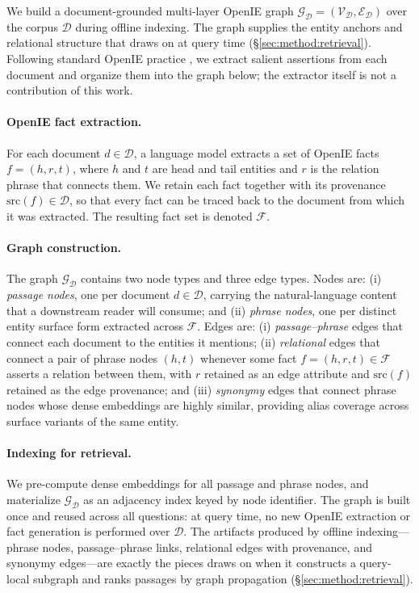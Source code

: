 We build a document-grounded multi-layer OpenIE graph
$\mathcal{G}_{\mathcal{D}}=(\mathcal{V}_{\mathcal{D}},\mathcal{E}_{\mathcal{D}})$
over the corpus $\mathcal{D}$ during offline indexing. The graph supplies
the entity anchors and relational structure that \methodname{} draws on at
query time (\S\ref{sec:method:retrieval}). Following standard OpenIE
practice \citep{angeli2015leveraging,gutierrez2025hipporag}, we extract
salient assertions from each document and organize them into the graph
below; the extractor itself is not a contribution of this work.

\paragraph{OpenIE fact extraction.}
For each document $d \in \mathcal{D}$, a language model extracts a set of
OpenIE facts $f = (h, r, t)$, where $h$ and $t$ are head and tail entities
and $r$ is the relation phrase that connects them. We retain each fact
together with its provenance $\mathrm{src}(f) \in \mathcal{D}$, so that
every fact can be traced back to the document from which it was extracted.
The resulting fact set is denoted $\mathcal{F}$.

\paragraph{Graph construction.}
The graph $\mathcal{G}_{\mathcal{D}}$ contains two node types and three
edge types. Nodes are: (i) \emph{passage nodes}, one per document
$d \in \mathcal{D}$, carrying the natural-language content that a
downstream reader will consume; and (ii) \emph{phrase nodes}, one per
distinct entity surface form extracted across $\mathcal{F}$. Edges are:
(i) \emph{passage--phrase} edges that connect each document to the
entities it mentions; (ii) \emph{relational} edges that connect a pair of
phrase nodes $(h, t)$ whenever some fact $f = (h, r, t) \in \mathcal{F}$
asserts a relation between them, with $r$ retained as an edge attribute
and $\mathrm{src}(f)$ retained as the edge provenance; and (iii)
\emph{synonymy} edges that connect phrase nodes whose dense embeddings
are highly similar, providing alias coverage across surface variants of
the same entity.

\paragraph{Indexing for retrieval.}
We pre-compute dense embeddings for all passage and phrase nodes, and
materialize $\mathcal{G}_{\mathcal{D}}$ as an adjacency index keyed by
node identifier. The graph is built once and reused across all questions:
at query time, no new OpenIE extraction or fact generation is performed
over $\mathcal{D}$. The artifacts produced by offline indexing---phrase
nodes, passage--phrase links, relational edges with provenance, and
synonymy edges---are exactly the pieces \methodname{} draws on when it
constructs a query-local subgraph and ranks passages by graph propagation
(\S\ref{sec:method:retrieval}).

